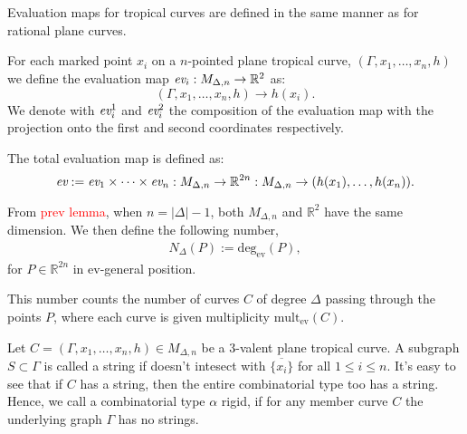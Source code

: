 Evaluation maps for tropical curves are defined in the same manner as for rational plane curves.
\begin{definition}
    For each marked point $x_{i}$ on a $n$-pointed plane tropical curve, $(\Gamma,x_{1},\dots,x_{n},h)$ we define the evaluation map $\emph{ev}_{i}:M_{\Delta, n} \to \mathbb{R}^{2}$ as:
    \[
        (\Gamma,x_{1},\dots,x_{n},h) \to h(x_{i}).
    \]
    We denote with $\emph{ev}_{i}^{1}$ and $\emph{ev}_{i}^{2}$ the composition of the evaluation map with the projection onto the first and second coordinates respectively.
    \par The total evaluation map is defined as:
    \[
        \emph{ev} := \emph{ev}_{1} \times \dots \times \emph{ev}_{n}:M_{\Delta, n} \to \mathbb{R}^{2n}: M_{\Delta, n} \to (h(x_{1}),\dots,h(x_{n})).
    \]
\end{definition}

\begin{remark}
    
\end{remark}

\begin{remark}
    From \textcolor{red}{prev lemma}, when $n = |\Delta|-1$, both $M_{\Delta, n}$ and $\mathbb{R}^{2}$ have the same dimension. We then define the following number,
    \begin{align*}
        N_{\Delta}(P) := \text{deg}_{\text{ev}}(P),
    \end{align*}
    for $P \in \mathbb{R}^{2n}$ in $\text{ev}$-general position.
    \par This number counts the number of curves $C$ of degree $\Delta$ passing through the points $P$, where each curve is given multiplicity $\text{mult}_{\text{ev}}(C)$.
\end{remark}

\begin{definition}
    Let $C = (\Gamma, x_{1},\dots, x_{n}, h) \in M_{\Delta, n}$ be a $3$-valent plane tropical curve. 
    A subgraph $S \subset \Gamma$ is called a string if doesn't intesect with $\overline{\{x_{i}\}}$ for all $1 \leq i \leq n$.
    It's easy to see that if $C$ has a string, then the entire combinatorial type too has a string.
    Hence, we call a combinatorial type $\alpha$ rigid, if for any member curve $C$ the underlying graph $\Gamma$ has no strings.
\end{definition}

